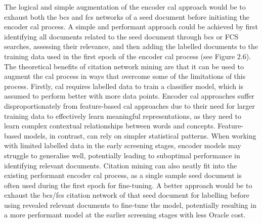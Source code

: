 \documentclass[10pt,oneside]{book}
\begin{document}
The logical and simple augmentation of the encoder \gls*{cal} approach would be to exhaust both the \gls*{bcs} and \gls*{fcs} networks of a seed document before initiating the encoder \gls*{cal} process. A simple and performant approach could be achieved by first identifying all documents related to the seed document through \gls*{bcs} or FCS searches, assessing their relevance, and then adding the labelled documents to the training data used in the first epoch of the encoder \gls*{cal} process (see Figure 2.6). The theoretical benefits of citation network mining are that it can be used to augment the \gls*{cal} process in ways that overcome some of the limitations of this process. Firstly, \gls*{cal} requires labelled data to train a classifier model, which is assumed to perform better with more data points. Encoder \gls*{cal} approaches suffer disproportionately from feature-based \gls*{cal} approaches due to their need for larger training data to effectively learn meaningful representations, as they need to learn complex contextual relationships between words and concepts. Feature-based models, in contrast, can rely on simpler statistical patterns. When working with limited labelled data in the early screening stages, encoder models may struggle to generalise well, potentially leading to suboptimal performance in identifying relevant documents. Citation mining can also neatly fit into the existing performant encoder \gls*{cal} process, as a single sample seed document is often used during the first epoch for fine-tuning. A better approach would be to exhaust the \gls*{bcs}/\gls*{fcs} citation network of that seed document for labelling before using revealed relevant documents to fine-tune the model, potentially resulting in a more performant model at the earlier screening stages with less Oracle cost.
\end{document}
